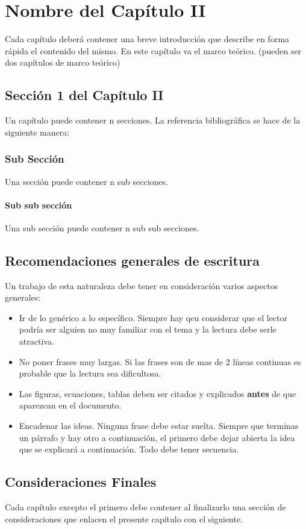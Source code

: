 \chapter{Nombre del Capítulo II}

Cada capítulo deberá contener una breve introducción que describe en forma rápida el contenido del
mismo. En este capítulo va el marco teórico. (pueden ser dos capítulos de marco teórico)

\section{Sección 1 del Capítulo II}

Un capítulo puede contener n secciones. La referencia bibliográfica se hace de la siguiente manera:
\cite{Mateos00}

\subsection{Sub Sección}

Una sección puede contener n sub secciones.\cite{Galante01}

\subsubsection{Sub sub sección}

Una sub sección puede contener n sub sub secciones.

\section{Recomendaciones generales de escritura}
Un trabajo de esta naturaleza debe tener en consideración varios aspectos generales:

\begin{itemize}
\item Ir de lo genérico a lo específico. Siempre hay qeu considerar que el lector podría ser alguien no muy familiar con el tema 
y la lectura debe serle atractiva.
\item No poner frases muy largas. Si las frases son de mas de 2 líneas continuas es probable que la lectura sea dificultosa.
\item Las figuras, ecuaciones, tablas deben ser citados y explicados {\bf antes} de que aparezcan en el documento.
\item Encadenar las ideas. Ninguna frase debe estar suelta. Siempre que terminas un párrafo y hay otro a continuación, 
el primero debe dejar abierta la idea que se explicará a continuación. Todo debe tener secuencia.
\end{itemize}


\section{Consideraciones Finales}

Cada capítulo excepto el primero debe contener al finalizarlo una sección de consideraciones que enlacen
el presente capítulo con el siguiente.
